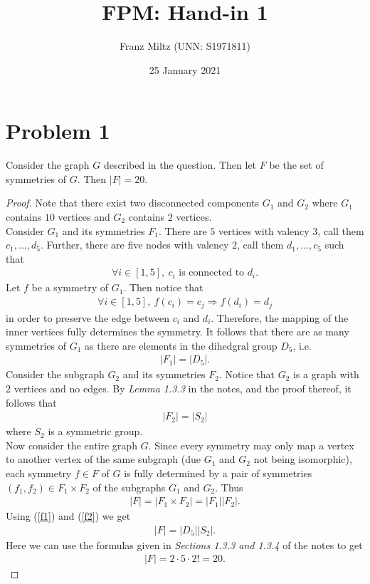 \documentclass{article}
\begin{document}
\title{FPM: Hand-in 1}
\author{Franz Miltz (UNN: S1971811)}
\date{25 January 2021}
\maketitle

\section*{Problem 1}
\begin{claim}
   Consider the graph $G$ described in the question. Then
   let $F$ be the set of symmetries of $G$. Then $|F|=20$.
\end{claim}
\begin{proof}
   Note that there exist two disconnected components
   $G_1$ and $G_2$ where $G_1$ contains $10$ vertices
   and $G_2$ contains $2$ vertices. \\
   Consider $G_1$ and its symmetries $F_1$. There are $5$ vertices with valency
   $3$, call them $c_1, ..., d_5$. Further, there are
   five nodes with valency $2$, call them $d_1, ..., c_5$
   such that
   \begin{align*}
      \forall i\in[1,5],\: c_i \text{ is connected to } d_i.
   \end{align*}
   Let $f$ be a symmetry of $G_1$. Then notice that
   \begin{align*}
      \forall i\in[1,5],\: f(c_i)=c_j \Rightarrow f(d_i)=d_j
   \end{align*}
   in order to preserve the edge between $c_i$ and $d_i$.
   Therefore, the mapping of the inner vertices fully
   determines the symmetry. It follows that there are as
   many symmetries of $G_1$ as there are elements in the
   dihedgral group $D_5$, i.e.
   \begin{align}
      \label{f1}
      |F_1|=|D_5|.
   \end{align}
   Consider the subgraph $G_2$ and its symmetries $F_2$.
   Notice that $G_2$ is a graph with $2$ vertices and
   no edges. By \emph{Lemma 1.3.3} in the notes, and the
   proof thereof, it follows that
   \begin{align}
      \label{f2}
      |F_2|=|S_2|
   \end{align}
   where $S_2$ is a symmetric group.\\
   Now consider the entire graph $G$. Since every symmetry may
   only map a vertex to another vertex of the same subgraph
   (due $G_1$ and $G_2$ not being isomorphic),
   each symmetry $f\in F$ of $G$ is fully determined by
   a pair of symmetries $(f_1, f_2)\in F_1\times F_2$ of
   the subgraphs $G_1$ and $G_2$. Thus
   \begin{align*}
      |F| = |F_1\times F_2| = |F_1||F_2|.
   \end{align*}
   Using (\ref{f1}) and (\ref{f2}) we get
   \begin{align*}
      |F| = |D_5||S_2|.
   \end{align*}
   Here we can use the formulas given in \emph{Sections 1.3.3
      and 1.3.4} of the notes to get
   \begin{align*}
      |F| = 2\cdot 5\cdot 2! = 20.
   \end{align*}
\end{proof}
\end{document}
